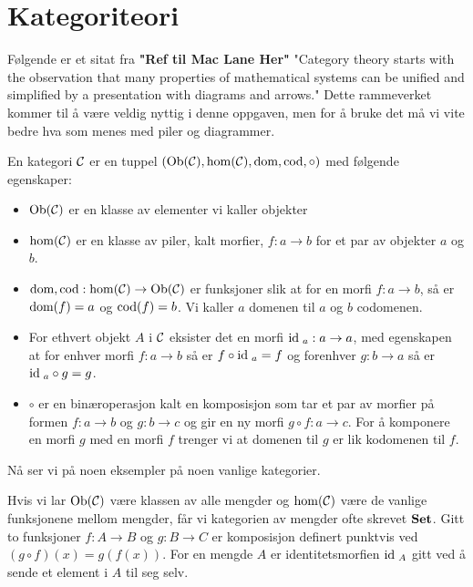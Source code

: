\section{Kategoriteori}

Følgende er et sitat fra \textbf{"Ref til Mac Lane Her"} "Category
theory starts with the observation that many properties of
mathematical systems can be unified and simplified by
a presentation with diagrams and arrows." Dette rammeverket kommer
til å være veldig nyttig i denne oppgaven, men for å bruke det må
vi vite bedre hva som menes med piler og diagrammer.

\begin{definisjon}\label{def:Kat}
En kategori $\mathcal{C}$ er en tuppel
$(\textnormal{Ob}(\mathcal{C}),\hom(\mathcal{C}),\textnormal{dom},\textnormal{cod},\circ)$ med følgende
egenskaper:
\begin{itemize}
\item $\textnormal{Ob}(\mathcal{C})$ er en klasse av elementer vi kaller objekter
\item $\hom(\mathcal{C})$ er en klasse av piler, kalt morfier, $f:a\to b$ for et par av objekter $a$ og $b$.
\item $\textnormal{dom},\textnormal{cod}:\hom(\mathcal{C})\to\textnormal{Ob}(\mathcal{C})$ er funksjoner slik at
for en morfi $f:a\to b$, så er $\textnormal{dom}(f) = a$ og $\textnormal{cod}(f) = b$. Vi
kaller $a$ domenen til $a$ og $b$ codomenen.
\item For ethvert objekt $A$ i $\mathcal{C}$ eksister det en morfi
$\textnormal{id}\;_a:a\to a$, med egenskapen at for enhver morfi $f:a\to b$ så
er $f\circ\textnormal{id}\;_a = f$ og forenhver $g: b\to a$ så er $\textnormal{id}\;_a\circ g=
g$.
\item $\circ$ er en binæroperasjon kalt en komposisjon som tar et par av morfier på
formen $f:a\to b$ og $g: b\to c$ og gir en ny morfi $g\circ f:
a\to c$. For å komponere en morfi $g$ med en morfi $f$ trenger vi
at domenen til $g$ er lik kodomenen til $f$.
\end{itemize}
\end{definisjon}

Nå ser vi på noen eksempler på noen vanlige kategorier.

\begin{eksempel}\label{eks:Setkat}
  Hvis vi lar $\textnormal{Ob}(\mathcal{C})$ være klassen av alle mengder og
  $\hom(\mathcal{C})$ være de vanlige funksjonene mellom mengder, får vi
  kategorien av mengder ofte skrevet $\textnormal{\textbf{Set}}$. Gitt to funksjoner
  $f:A\to B$ og $g:B\to C$ er komposisjon definert punktvis ved
  $(g\circ f)(x) = g(f(x))$. For en mengde $A$ er
  identitetsmorfien $\textnormal{id}\;_A$ gitt ved å sende et element i $A$ til
  seg selv.
\end{eksempel}

